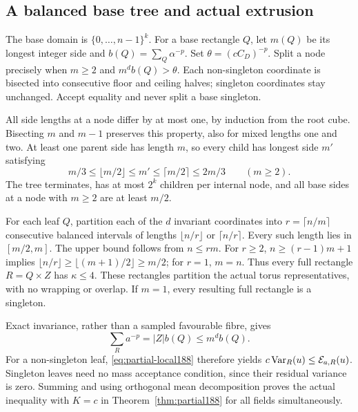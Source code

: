 \subsection{A balanced base tree and actual extrusion}
The base domain is $\{0,\ldots,n-1\}^k$. For a base rectangle $Q$, let
$m(Q)$ be its longest integer side and $b(Q)=\sum_Q\alpha^{-p}$.
Set $\theta=(cC_D)^{-p}$. Split a node precisely when
$m\ge2$ and $m^d b(Q)>\theta$. Each non-singleton coordinate is bisected
into consecutive floor and ceiling halves; singleton coordinates stay
unchanged. Accept equality and never split a base singleton.

All side lengths at a node differ by at most one, by induction from the
root cube. Bisecting $m$ and $m-1$ preserves this property, also for mixed
lengths one and two. At least one parent side has length $m$, so every
child has longest side $m'$ satisfying
\begin{equation}\label{eq:partial-child188}
 m/3\le\lfloor m/2\rfloor\le m'\le\lceil m/2\rceil\le2m/3
 \qquad(m\ge2).
\end{equation}
The tree terminates, has at most $2^k$ children per internal node, and
all base sides at a node with $m\ge2$ are at least $m/2$.

For each leaf $Q$, partition each of the $d$ invariant coordinates into
$r=\lceil n/m\rceil$ consecutive balanced intervals of lengths
$\lfloor n/r\rfloor$ or $\lceil n/r\rceil$. Every such length lies in
$[m/2,m]$. The upper bound follows from $n\le rm$. For $r\ge2$,
$n\ge(r-1)m+1$ implies
$\lfloor n/r\rfloor\ge\lfloor(m+1)/2\rfloor\ge m/2$; for $r=1$,
$m=n$. Thus every full rectangle $R=Q\times Z$ has $\kappa\le4$.
These rectangles partition the actual torus representatives, with no
wrapping or overlap. If $m=1$, every resulting full rectangle is a singleton.

Exact invariance, rather than a sampled favourable fibre, gives
\[
 \sum_Ra^{-p}=|Z|b(Q)\le m^d b(Q).
\]
For a non-singleton leaf, \eqref{eq:partial-local188} therefore yields
$c\operatorname{Var}_R(u)\le\mathcal E_{a,R}(u)$. Singleton leaves need no mass
acceptance condition, since their residual variance is zero. Summing and
using orthogonal mean decomposition proves the actual inequality with
$K=c$ in Theorem~\ref{thm:partial188} for all fields simultaneously.

